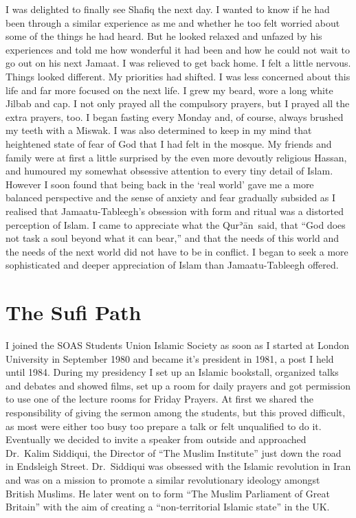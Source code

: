 \documentclass[12pt]{memoir}
\def\´{ʾ} %
\newcommand{\cor}[2]{#2} %
\def \Quran{Qur\-\´ān} %
\def\–{-\hskip0pt}
\begin{document}
I was delighted to finally see Shafiq the next day.
I wanted to know if he had been through a similar experience as me
and whether he too felt worried about some of the things he had heard.
But he looked relaxed and \cor{un-phased}{unfazed} by his experiences
and told me how wonderful it had been
and how he could not wait to go out on his next Jamaat.
I was relieved to get back home.
I felt a little nervous.
Things looked different.
My priorities had shifted.
I was less concerned about this life and far more focused on the next life.
I grew my beard, wore a long white Jilbab and cap.
I not only prayed all the compulsory prayers,
but I prayed all the extra prayers, too.
I began fasting every Monday and, of course,
always brushed my teeth with a Miswak.
I was also determined to keep in my mind
that heightened state of fear of God that I had felt in the mosque.
My friends and family were at first a little surprised
by the even more devoutly religious Hassan,
and humoured my somewhat obsessive attention to every tiny detail of Islam.
However I soon found that being back in the ‘real world’
gave me a more balanced perspective
and the sense of anxiety and fear gradually subsided
as I realised that Jamaatu\cor{ }{\–}Tableegh’s obsession
with form and ritual was a distorted perception of Islam.
I came to appreciate what the \Quran\ said, that
“God does not task a soul beyond what it can bear,”
and that the needs of this world
and the needs of the next world did not have to be in conflict.
I began to seek a more sophisticated and deeper appreciation of Islam than
Jamaatu\–Tableegh offered.


\chapter{The Sufi Path}


I joined the SOAS Students Union Islamic Society as soon as I started
at London University in September 1980 and became it’s president in 1981,
a post I held until 1984.
During my presidency I set up an Islamic bookstall,
organized talks and debates and showed films,
set up a room for daily prayers and got permission
to use one of the lecture rooms for Friday Prayers.
At first we shared the responsibility of giving the sermon among the students,
but this proved difficult,
as most were either too busy too prepare a talk or felt unqualified to do it.
Eventually we decided to invite a speaker from outside
and approached Dr.\ Kalim Siddiqui,
the Director of “The Muslim Institute” just down the road in Endsleigh Street.
Dr.\ Siddiqui was obsessed with the Islamic revolution in Iran
and was on a mission to promote a similar revolutionary ideology
amongst British Muslims.
He later went on to form “The Muslim Parliament of Great Britain”
with the aim of creating a “non-territorial Islamic state” in the UK.
\end{document}
